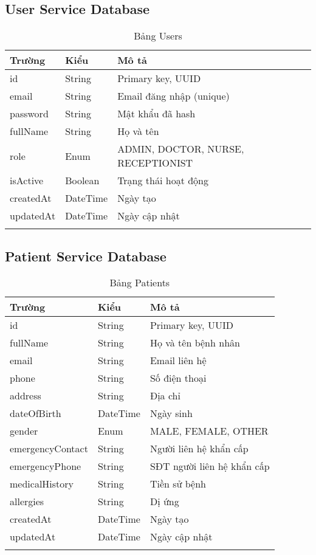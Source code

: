 \documentclass[12pt,a4paper]{report}
\begin{document}
\subsection{User Service Database}
\begin{longtable}{|p{3cm}|p{2cm}|p{8cm}|}
\hline
\textbf{Trường} & \textbf{Kiểu} & \textbf{Mô tả} \\
\hline
id & String & Primary key, UUID \\
\hline
email & String & Email đăng nhập (unique) \\
\hline
password & String & Mật khẩu đã hash \\
\hline
fullName & String & Họ và tên \\
\hline
role & Enum & ADMIN, DOCTOR, NURSE, RECEPTIONIST \\
\hline
isActive & Boolean & Trạng thái hoạt động \\
\hline
createdAt & DateTime & Ngày tạo \\
\hline
updatedAt & DateTime & Ngày cập nhật \\
\hline
\caption{Bảng Users}
\end{longtable}

\subsection{Patient Service Database}
\begin{longtable}{|p{3cm}|p{2cm}|p{8cm}|}
\hline
\textbf{Trường} & \textbf{Kiểu} & \textbf{Mô tả} \\
\hline
id & String & Primary key, UUID \\
\hline
fullName & String & Họ và tên bệnh nhân \\
\hline
email & String & Email liên hệ \\
\hline
phone & String & Số điện thoại \\
\hline
address & String & Địa chỉ \\
\hline
dateOfBirth & DateTime & Ngày sinh \\
\hline
gender & Enum & MALE, FEMALE, OTHER \\
\hline
emergencyContact & String & Người liên hệ khẩn cấp \\
\hline
emergencyPhone & String & SĐT người liên hệ khẩn cấp \\
\hline
medicalHistory & String & Tiền sử bệnh \\
\hline
allergies & String & Dị ứng \\
\hline
createdAt & DateTime & Ngày tạo \\
\hline
updatedAt & DateTime & Ngày cập nhật \\
\hline
\caption{Bảng Patients}
\end{longtable}
\end{document}
